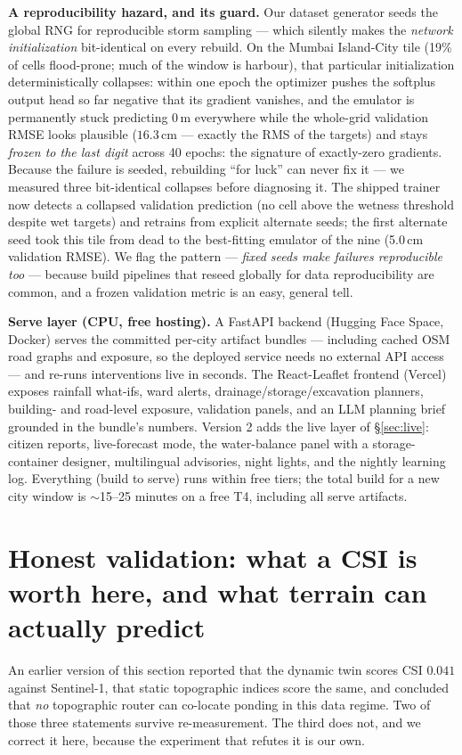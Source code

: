 \documentclass[10pt]{article}
\begin{document}
\textbf{A reproducibility hazard, and its guard.} Our dataset generator seeds the global RNG for
reproducible storm sampling --- which silently makes the \emph{network initialization} bit-identical
on every rebuild. On the Mumbai Island-City tile (19\% of cells flood-prone; much of the window is
harbour), that particular initialization deterministically collapses: within one epoch the
optimizer pushes the softplus output head so far negative that its gradient vanishes, and the
emulator is permanently stuck predicting 0\,m everywhere while the whole-grid validation RMSE looks
plausible ($16.3$\,cm --- exactly the RMS of the targets) and stays \emph{frozen to the last digit}
across 40 epochs: the signature of exactly-zero gradients. Because the failure is seeded, rebuilding
``for luck'' can never fix it --- we measured three bit-identical collapses before diagnosing it.
The shipped trainer now detects a collapsed validation prediction (no cell above the wetness
threshold despite wet targets) and retrains from explicit alternate seeds; the first alternate seed
took this tile from dead to the best-fitting emulator of the nine (5.0\,cm validation RMSE). We
flag the pattern --- \emph{fixed seeds make failures reproducible too} --- because build pipelines
that reseed globally for data reproducibility are common, and a frozen validation metric is an
easy, general tell.

\textbf{Serve layer (CPU, free hosting).} A FastAPI backend (Hugging Face Space, Docker) serves the
committed per-city artifact bundles --- including cached OSM road graphs and exposure, so the deployed
service needs no external API access --- and re-runs interventions live in seconds. The React-Leaflet
frontend (Vercel) exposes rainfall what-ifs, ward alerts, drainage/storage/excavation planners,
building- and road-level exposure, validation panels, and an LLM planning brief grounded in the
bundle's numbers. Version 2 adds the live layer of \S\ref{sec:live}: citizen reports, live-forecast
mode, the water-balance panel with a storage-container designer, multilingual advisories, night
lights, and the nightly learning log. Everything (build to serve) runs within free tiers; the total
build for a new city window is $\sim$15--25 minutes on a free T4, including all serve artifacts.

\section{Honest validation: what a CSI is worth here, and what terrain can actually predict}
\label{sec:validation}
An earlier version of this section reported that the dynamic twin scores CSI $0.041$ against
Sentinel-1, that static topographic indices score the same, and concluded that \emph{no}
topographic router can co-locate ponding in this data regime. Two of those three statements
survive re-measurement. The third does not, and we correct it here, because the experiment that
refutes it is our own.
\end{document}
